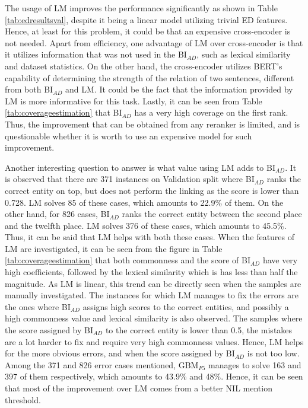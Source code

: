 \documentclass{report}
\theoremstyle{definition}
\theoremstyle{remark}
\begin{document}
The usage of LM improves the performance significantly as shown in Table \ref{tab:edresultsval}, despite it being a linear model utilizing trivial ED features. Hence, at least for this problem, it could be that an expensive cross-encoder is not needed. Apart from efficiency, one advantage of LM over cross-encoder is that it utilizes information that was not used in the BI$_{AD}$, such as lexical similarity and dataset statistics. On the other hand, the cross-encoder utilizes BERT's capability of determining the strength of the relation of two sentences, different from both BI$_{AD}$ and LM. It could be the fact that the information provided by LM is more informative for this task. Lastly, it can be seen from Table \ref{tab:coverageestimation} that BI$_{AD}$ has a very high coverage on the first rank. Thus, the improvement that can be obtained from any reranker is limited, and is questionable whether it is worth to use an expensive model for such improvement.

Another interesting question to answer is what value using LM adds to BI$_{AD}$. It is observed that there are 371 instances on Validation split where BI$_{AD}$ ranks the correct entity on top, but does not perform the linking as the score is lower than 0.728. LM solves 85 of these cases, which amounts to 22.9\% of them. On the other hand, for 826 cases, BI$_{AD}$ ranks the correct entity between the second place and the twelfth place. LM solves 376 of these cases, which amounts to 45.5\%. Thus, it can be said that LM helps with both these cases. When the features of LM are investigated, it can be seen from the figure in Table \ref{tab:coverageestimation} that both commonness and the score of BI$_{AD}$ have very high coefficients, followed by the lexical similarity which is has less than half the magnitude. As LM is linear, this trend can be directly seen when the samples are manually investigated. The instances for which LM manages to fix the errors are the ones where BI$_{AD}$ assigns high scores to the correct entities, and possibly a high commonness value and lexical similarity is also observed. The samples where the score assigned by BI$_{AD}$ to the correct entity is lower than 0.5, the mistakes are a lot harder to fix and require very high commonness values. Hence, LM helps for the more obvious errors, and when the score assigned by BI$_{AD}$ is not too low. Among the 371 and 826 error cases mentioned, GBM$_{F5}$ manages to solve 163 and 397 of them respectively, which amounts to 43.9\% and 48\%. Hence, it can be seen that most of the improvement over LM comes from a better NIL mention threshold.
\end{document}

